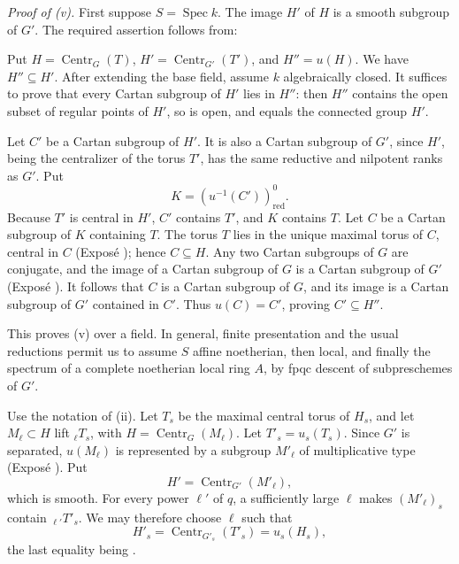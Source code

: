 \medskip\noindent\textit{Proof of (v).}
First suppose \(S=\operatorname{Spec}k\). The image \(H'\) of \(H\)
is a smooth subgroup of \(G'\). The required assertion follows from:


Put \(H=\operatorname{Centr}_G(T)\),
\(H'=\operatorname{Centr}_{G'}(T')\), and \(H''=u(H)\). We have
\(H''\subseteq H'\). After extending the base field, assume \(k\)
algebraically closed. It suffices to prove that every Cartan subgroup
of \(H'\) lies in \(H''\): then \(H''\) contains the open subset of
regular points of \(H'\), so is open, and equals the connected group
\(H'\).

Let \(C'\) be a Cartan subgroup of \(H'\). It is also a Cartan
subgroup of \(G'\), since \(H'\), being the centralizer of the torus
\(T'\), has the same reductive and nilpotent ranks as \(G'\). Put
\[
  K=(u^{-1}(C'))^0_{\mathrm{red}}.
\]
Because \(T'\) is central in \(H'\), \(C'\) contains \(T'\), and
\(K\) contains \(T\). Let \(C\) be a Cartan subgroup of \(K\)
containing \(T\). The torus \(T\) lies in the unique maximal torus of
\(C\), central in \(C\) (Exposé ); hence
\(C\subseteq H\). Any two Cartan subgroups of \(G\) are conjugate,
and the image of a Cartan subgroup of \(G\) is a Cartan subgroup of
\(G'\) (Exposé ). It follows that \(C\) is a Cartan subgroup
of \(G\), and its image is a Cartan subgroup of \(G'\) contained in
\(C'\). Thus \(u(C)=C'\), proving \(C'\subseteq H''\).

This proves (v) over a field. In general, finite presentation and the
usual reductions permit us to assume \(S\) affine noetherian, then
local, and finally the spectrum of a complete noetherian local ring
\(A\), by fpqc descent of subpreschemes of \(G'\).

Use the notation of (ii). Let \(T_s\) be the maximal central torus of
\(H_s\), and let \(M_\ell\subset H\) lift \({}_\ell T_s\), with
\(H=\operatorname{Centr}_G(M_\ell)\). Let \(T'_s=u_s(T_s)\).
Since \(G'\) is separated, \(u(M_\ell)\) is represented by a subgroup
\(M'_\ell\) of multiplicative type (Exposé ). Put
\[
  H'=\operatorname{Centr}_{G'}(M'_\ell),
\]
which is smooth. For every power \(\ell'\) of \(q\), a sufficiently
large \(\ell\) makes \((M'_\ell)_s\) contain
\({}_{\ell'}T'_s\). We may therefore choose \(\ell\) such that
\[
 H'_s=\operatorname{Centr}_{G'_s}(T'_s)=u_s(H_s),
\]
the last equality being .

